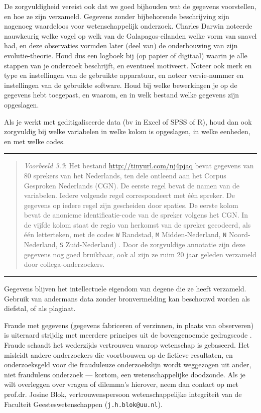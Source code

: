 \documentclass[
]{book}
\begin{document}
De zorgvuldigheid vereist ook dat we goed bijhouden wat de gegevens
voorstellen, en hoe ze zijn verzameld. Gegevens zonder bijbehorende
beschrijving zijn nagenoeg waardeloos voor wetenschappelijk onderzoek.
Charles Darwin noteerde nauwkeurig welke vogel op welk van de
Galapagos-eilanden welke vorm van snavel had, en deze observaties
vormden later (deel van) de onderbouwing van zijn evolutie-theorie. Houd
dus een logboek bij (op papier of digitaal) waarin je alle stappen van
je onderzoek beschrijft, en eventueel motiveert. Noteer ook merk en type
en instellingen van de gebruikte apparatuur, en noteer versie-nummer en
instellingen van de gebruikte software. Houd bij welke bewerkingen je op
de gegevens hebt toegepast, en waarom, en in welk bestand welke gegevens
zijn opgeslagen.

Als je werkt met geditigaliseerde data (bv in Excel of SPSS of R), houd
dan ook zorgvuldig bij welke variabelen in welke kolom is opgeslagen, in
welke eenheden, en met welke codes.

\begin{center}\rule{0.5\linewidth}{0.5pt}\end{center}

\begin{quote}
\emph{Voorbeeld 3.3}: Het
bestand \url{http://tinyurl.com/nj4pjaq} bevat gegevens van 80 sprekers van
het Nederlands, ten dele ontleend aan het Corpus Gesproken Nederlands
(CGN). De eerste regel bevat de namen van de variabelen. Iedere volgende
regel correspondeert met één spreker. De gegevens op iedere regel zijn
gescheiden door spaties. De eerste kolom bevat de anonieme
identificatie-code van de spreker volgens het CGN. In de vijfde kolom
staat de regio van herkomst van de spreker gecodeerd, als één
letterteken, met de codes \texttt{W} Randstad, \texttt{M} Midden-Nederland, \texttt{N}
Noord-Nederland, \texttt{S} Zuid-Nederland) \citep{Quene08}. Door de zorgvuldige
annotatie zijn deze gegevens nog goed bruikbaar, ook al zijn ze ruim 20
jaar geleden verzameld door collega-onderzoekers.
\end{quote}

\begin{center}\rule{0.5\linewidth}{0.5pt}\end{center}

Gegevens blijven het intellectuele eigendom van degene die ze heeft
verzameld. Gebruik van andermans data zonder bronvermelding kan
beschouwd worden als diefstal, of als plagiaat.

Fraude met gegevens (gegevens fabriceren of verzinnen, in plaats van
observeren) is uiteraard strijdig met meerdere principes uit de
bovengenoemde gedragscode \citep{VSNU18}. Fraude schaadt het wederzijds
vertrouwen waarop wetenschap is gebaseerd. Het misleidt andere
onderzoekers die voortbouwen op de fictieve resultaten, en
onderzoeksgeld voor die frauduleuze onderzoekslijn wordt weggezogen uit
ander, niet frauduleus onderzoek --- kortom, een wetenschappelijke
doodzonde. Als je wilt overleggen over vragen of dilemma's hierover,
neem dan contact op met prof.dr. Josine Blok, vertrouwenspersoon
wetenschappelijke integriteit van de Faculteit Geesteswetenschappen
(\texttt{j.h.blok@uu.nl}).
\end{document}
